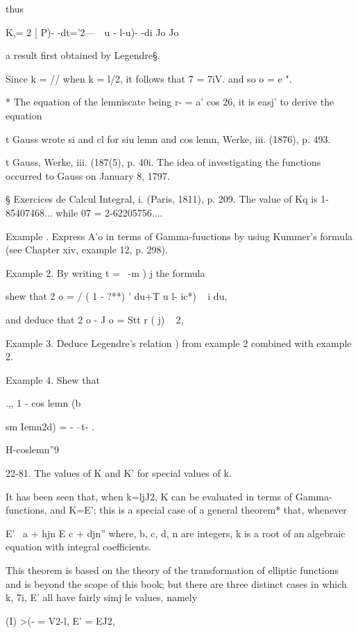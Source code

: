 thus

K,= 2 [ P)- -dt='2---\ \ u - l-u)- -di Jo Jo

a result first obtained by Legendre§.

Since k = // when k = l/\/2, it follows that 7 = 7iV. and so o = e ".

* The equation of the lemniscate being r- = a' cos 26, it is easj' to
derive the equation


t Gauss wrote si and cl for siu lemn and cos lemn, Werke, iii. (1876),
p. 493.

t Gauss, Werke, iii. (187(5), p. 40i. The idea of investigating the
functions occurred to Gauss on January 8, 1797.

§ Exercices de Calcul Integral, i. (Paris, 1811), p. 209. The value of
Kq is 1-85407468... while 07 = 2-62205756....

%
%

Example . Express A'o in terms of Gamma-fuuctions by usiug Kummer's
formula (see Chapter xiv, example 12, p. 298).

Example 2. By writing t = \ -m ) j the formula

shew that 2 o = / ( 1 - ?**) ' du+T u l- ic*) ~ i du,

and deduce that 2 o - J o = Stt r ( j) ~ 2,

Example 3. Deduce Legendre's relation ) from example 2
combined with example 2.

Example 4. Shew that

.,, 1 - cos lemn (b

sm Iemn2d) = - --t- .

H-coslemn''9

22-81. The values of K and K' for special values of k.

It has been seen that, when k=ljJ2, K can be evaluated in terms of
Gamma-functions, and K=E'; this is a special case of a general
theorem* that, whenever

E' \ a + hjn E c + djn'' where, b, c, d, n are integers, k is a root
of an algebraic equation with integral coefficients.

This theorem is based on the theory of the transformation of elliptic
functions and is beyond the scope of this book; but there are three
distinct cases in which k, 7i, E' all have fairly simj le values,
namely

(I) >(- = V2-l, E' = EJ2,

